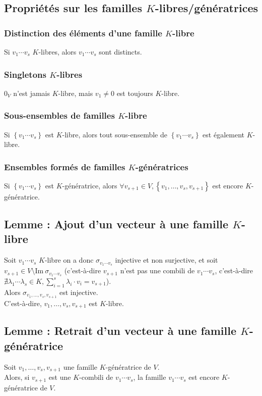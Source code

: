 \documentclass[a4paper,10pt]{article}
\newcommand{\set}[1]{\left\lbrace #1 \right\rbrace } %
\newcommand{\im}{\mathrm{Im}\:} %
\begin{document}
  \subsection{Propriétés sur les familles $K$-libres/génératrices}
   \subsubsection{Distinction des éléments d'une famille $K$-libre}
    Si $v_1 \cdots v_s$ $K$-libres, alors $v_1 \cdots v_s$ sont distincts.
    
   \subsubsection{Singletons $K$-libres}
    $0_V$ n'est jamais $K$-libre, mais $v_1 \neq 0$ est toujours $K$-libre.
    
   \subsubsection{Sous-ensembles de familles $K$-libre}
    Si $\set{v_1 \cdots v_s}$ est $K$-libre, alors tout sous-ensemble de $\set{v_1 \cdots v_s}$ est également $K$-libre.
    
   \subsubsection{Ensembles formés de familles $K$-génératrices}
    Si $\set{v_1 \cdots v_s}$ est $K$-génératrice, alors $\forall v_{s+1} \in V, \set{v_1, \hdots, v_s, v_{s+1}}$ est encore $K$-génératrice.

  \subsection{Lemme : Ajout d'un vecteur à une famille $K$-libre}
   Soit $v_1 \cdots v_s$ $K$-libre on a donc $\sigma_{v_1 \cdots v_s}$ injective et non surjective, et soit $v_{s+1} \in V\setminus \im \sigma_{v_1 \cdots v_s}$  (c'est-à-dire $v_{s+1}$ n'est pas une combili de $v_1 \cdots v_s$, c'est-à-dire $\nexists \lambda_1 \cdots \lambda_s \in K, \sum^{s}_{i=1}\lambda_i \cdot v_i=v_{s+1}$).\\
   Alors $\sigma_{v_1, \hdots, v_s, v_{s+1}}$ est injective.\\
   C'est-à-dire, $v_1, \hdots, v_s, v_{s+1}$ est $K$-libre.

  \subsection{Lemme : Retrait d'un vecteur à une famille $K$-génératrice}
   Soit $v_1, \hdots, v_s, v_{s+1}$ une famille $K$-génératrice de $V$.\\
   Alors, si $v_{s+1}$ est une $K$-combili de $v_1 \cdots v_s$, la famille $v_1 \cdots v_s$ est encore $K$-génératrice de $V$.
\end{document}
